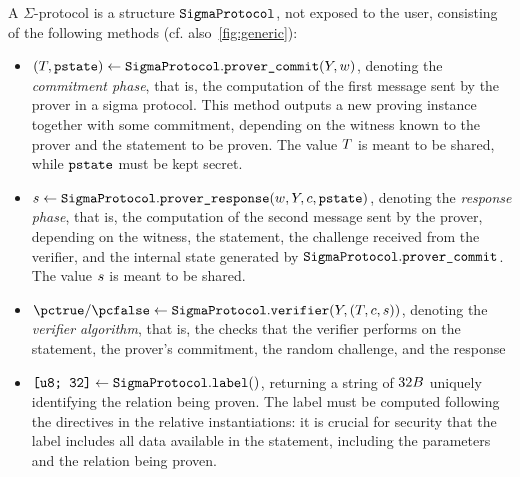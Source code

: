 \documentclass[runningheads,11pt]{article}
\begin{document}
A $\Sigma$-protocol is a structure $\texttt{SigmaProtocol}$, not exposed to the user, consisting of the following methods (cf. also~\cref{fig:generic}):
      \begin{itemize}
        \item
          $(T, \texttt{pstate})\gets \texttt{SigmaProtocol}.\texttt{prover\_commit}(Y, w)$,
          denoting the \emph{commitment phase}, that is, the computation of the first message sent by the prover in a sigma protocol. This method outputs a new proving instance together with some commitment, depending on the witness known to the prover and the statement to be proven.
					The value $T$ is meant to be shared, while $\texttt{pstate}$ must be kept secret.
        \item
          $s \gets \texttt{SigmaProtocol}.\texttt{prover\_response}(w, Y, c, \texttt{pstate})$,
          denoting the \emph{response phase}, that is, the computation of the second message sent by the prover, depending on the witness, the statement, the challenge received from the verifier, and the internal state generated by $\texttt{SigmaProtocol}.\texttt{prover\_commit}$.
          The value $s$ is meant to be shared.
        \item
          $\accept/\reject \gets \sigmaprotocol.\verifiertt(\statement, (\commitment, \challenge, \response))$,
          denoting the \emph{verifier algorithm}, that is, the checks that the verifier performs on the statement, the prover's commitment, the random challenge, and the response
          \item $\texttt{[u8; 32]} \gets \texttt{SigmaProtocol}.\texttt{label}()$,
          returning a string of $32B$ uniquely identifying the relation being proven. The label must be computed following the directives in the relative instantiations: it is crucial for security that the label includes all data available in the statement, including the parameters and the relation being proven.

\end{itemize}
\end{document}
